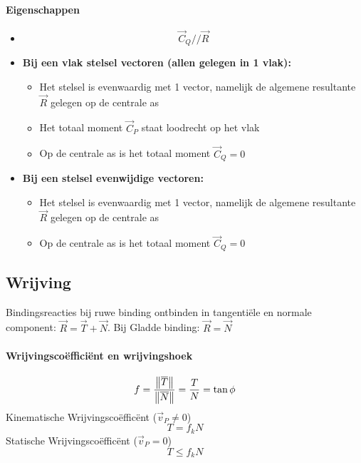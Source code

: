     \paragraph{Eigenschappen}
    \begin{itemize}
      \item \[ \vec{C}_Q // \vec{R}\]
      \item \textbf{Bij een vlak stelsel vectoren (allen gelegen in 1 vlak):}
            \begin{itemize}
              \item Het stelsel is evenwaardig met 1 vector, namelijk de algemene resultante $\vec{R}$ gelegen op de centrale as
              \item Het totaal moment $\vec{C}_P$ staat loodrecht op het vlak
              \item Op de centrale as is het totaal moment $\vec{C}_Q = 0$
            \end{itemize}
      \item \textbf{Bij een stelsel evenwijdige vectoren:}
            \begin{itemize}
              \item Het stelsel is evenwaardig met 1 vector, namelijk de algemene resultante $\vec{R}$ gelegen op de centrale as
              \item Op de centrale as is het totaal moment $\vec{C}_Q = 0$
            \end{itemize}
    \end{itemize}
    
\subsection{Wrijving}
\label{sec:Wrijving}
 Bindingsreacties bij ruwe binding ontbinden in tangentiële en normale component: $\vec{R} = \vec{T} + \vec{N}$. Bij Gladde binding: $\vec{R} =  \vec{N}$
 
 \paragraph{Wrijvingscoëfficiënt en wrijvingshoek}
   \[
     f = \frac{\left\| \overline{T} \right\|}{\left\| \overline{N} \right\|} = \frac{T}{N} = \tan \phi
   \]
   Kinematische Wrijvingscoëfficënt ($\vec{v}_P \neq 0$)
   \[
     T = f_k N
   \]
   Statische Wrijvingscoëfficënt ($\vec{v}_P = 0$)
   \[
     T \leq f_k N
   \]
 

